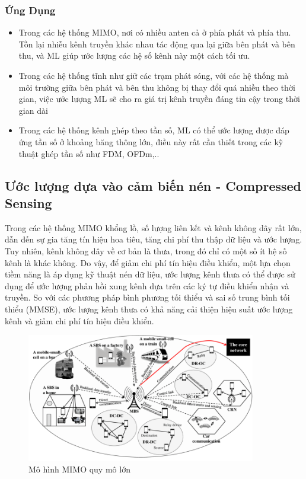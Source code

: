 \documentclass{article}
\begin{document}
\subsubsection{Ứng Dụng}
\begin{itemize}

\item Trong các hệ thống MIMO, nơi có nhiều anten cả ở phía phát và phía thu. Tồn lại nhiễu kênh truyền khác nhau tác động qua lại giữa bên phát và bên thu, và ML giúp ước lượng các hệ số kênh này một cách tối ưu.
\item Trong các hệ thống tĩnh như giữ các trạm phát sóng, với các hệ thống mà môi trường giữa bên phát và bên thu không bị thay đổi quá nhiều theo thời gian, việc ước lượng ML sẽ cho ra giá trị kênh truyền đáng tin cậy trong thời gian dài
\item Trong các hệ thống kênh ghép theo tần số, ML có thể ước lượng được đáp ứng tần số ở khoảng băng thông lớn, điều này rất cần thiết trong các kỹ thuật ghép tần số như FDM, OFDm,..

\end{itemize}

\subsection{Ước lượng dựa vào cảm biến nén - Compressed Sensing}

Trong các hệ thống MIMO khổng lồ, số lượng liên kết và kênh không dây rất lớn, dẫn đến sự gia tăng tín hiệu hoa tiêu, tăng chi phí thu thập dữ liệu và ước lượng. Tuy nhiên, kênh không dây về cơ bản là thưa, trong đó chỉ có một số ít hệ số kênh là khác không. Do vậy, để giảm chi phí tín hiệu điều khiển, một lựa chọn tiềm năng là áp dụng kỹ thuật nén dữ liệu, ước lượng kênh thưa có thể được sử dụng để ước lượng phản hồi xung kênh dựa trên các ký tự điều khiển nhận và truyền. So với các phương pháp bình phương tối thiểu và sai số trung bình tối thiểu (MMSE), ước lượng kênh thưa có khả năng cải thiện hiệu suất ước lượng kênh và giảm chi phí tín hiệu điều khiển.\\

\begin{figure}[h!]
    \centering
    \includegraphics[width=10cm]{photo/2.2.png}
    \caption{Mô hình MIMO quy mô lớn}
    \label{Hình 2}
\end{figure}
\end{document}
